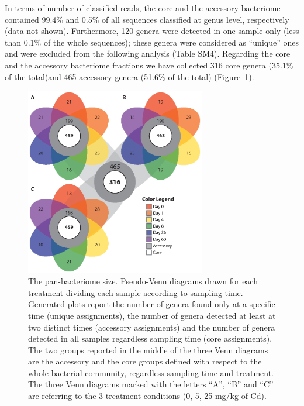In terms of number of classified reads, the core and the accessory bacteriome contained 99.4\% and 0.5\% of all sequences classified at genus level, respectively (data not shown). Furthermore, 120 genera were detected in one sample only (less than 0.1\% of the whole sequences); these genera were considered as ``unique'' ones and were excluded from the following analysis (Table SM4). Regarding the core and the accessory bacteriome fractions we have collected 316 core genera (35.1\% of the total)and 465 accessory genera (51.6\% of the total) (Figure~\ref{fig:4rom}).\\
\begin{figure}[!tb]
	\centering
	\includegraphics[width=0.7\textwidth]{./figures/Chapter_3/Fig4.eps}
  	\caption{The pan-bacteriome size. Pseudo-Venn diagrams drawn for each treatment dividing each sample according to sampling time. Generated plots report the number of genera found only at a specific time (unique assignments), the number of genera detected at least at two distinct times (accessory assignments) and the number of genera detected in all samples regardless sampling time (core assignments). The two groups reported in the middle of the three Venn diagrams are the accessory and the core groups defined with respect to the whole bacterial community, regardless sampling time and treatment. The three Venn diagrams marked with the letters ``A'', ``B'' and ``C'' are referring to the 3 treatment conditions (0, 5, 25 mg/kg of Cd). \label{fig:4rom}}
\end{figure}

